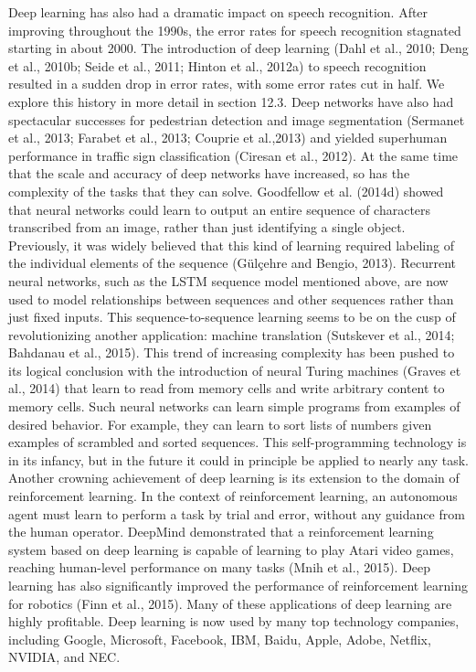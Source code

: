 \documentclass[11pt]{article}
\begin{document}
Deep learning has also had a dramatic impact on speech recognition.
After improving throughout the 1990s, the error rates for speech recognition stagnated starting in about 2000.
The introduction of deep learning (Dahl et al., 2010; Deng et al., 2010b; Seide et al., 2011; Hinton et al., 2012a) to speech recognition resulted in a sudden drop in error rates, with some error rates cut in half.
We explore this history in more detail in section 12.3.
Deep networks have also had spectacular successes for pedestrian detection and image segmentation (Sermanet et al., 2013; Farabet et al., 2013; Couprie et al.,2013) and yielded superhuman performance in traffic sign classification (Ciresan et al., 2012).
At the same time that the scale and accuracy of deep networks have increased, so has the complexity of the tasks that they can solve.
Goodfellow et al. (2014d) showed that neural networks could learn to output an entire sequence of characters transcribed from an image, rather than just identifying a single object.
Previously, it was widely believed that this kind of learning required labeling of the individual elements of the sequence (Gülçehre and Bengio, 2013).
Recurrent neural networks, such as the LSTM sequence model mentioned above, are now used to model relationships between sequences and other sequences rather than just fixed inputs.
This sequence-to-sequence learning seems to be on the cusp of revolutionizing another application: machine translation (Sutskever et al., 2014; Bahdanau et al., 2015).
This trend of increasing complexity has been pushed to its logical conclusion with the introduction of neural Turing machines (Graves et al., 2014) that learn to read from memory cells and write arbitrary content to memory cells.
Such neural networks can learn simple programs from examples of desired behavior.
For example, they can learn to sort lists of numbers given examples of scrambled and sorted sequences.
This self-programming technology is in its infancy, but in the future it could in principle be applied to nearly any task.
Another crowning achievement of deep learning is its extension to the domain of reinforcement learning.
In the context of reinforcement learning, an autonomous agent must learn to perform a task by trial and error, without any guidance from the human operator.
DeepMind demonstrated that a reinforcement learning system based on deep learning is capable of learning to play Atari video games, reaching human-level performance on many tasks (Mnih et al., 2015).
Deep learning has also significantly improved the performance of reinforcement learning for robotics (Finn et al., 2015).
Many of these applications of deep learning are highly profitable.
Deep learning is now used by many top technology companies, including Google, Microsoft, Facebook, IBM, Baidu, Apple, Adobe, Netﬂix, NVIDIA, and NEC.
\end{document}
